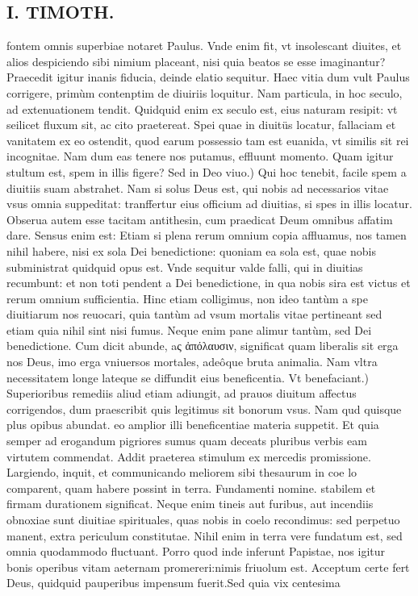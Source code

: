 \documentclass{article}
\begin{document}
\begin{pages}
\section*{I. TIMOTH. }
\marginpar{[ p.84 ]}\pstart fontem omnis superbiae notaret Paulus. Vnde enim fit, vt insolescant diuites, et alios despiciendo sibi nimium placeant, nisi quia beatos se esse imaginantur? Praecedit igitur inanis fiducia, deinde elatio sequitur. Haec vitia dum vult Paulus corrigere, primùm contenptim de diuiriis loquitur. Nam particula, in hoc seculo, ad extenuationem tendit. Quidquid enim ex seculo est, eius naturam resipit: vt seilicet fluxum sit, ac cito praetereat. Spei quae in diuitüs locatur, fallaciam et vanitatem ex eo ostendit, quod earum possessio tam est euanida, vt similis sit rei incognitae. Nam dum eas tenere nos putamus, effluunt momento. Quam igitur stultum est, spem in illis figere?  \pend\pstart Sed in Deo viuo.) Qui hoc tenebit, facile spem a diuitiis suam abstrahet. Nam si solus Deus est, qui nobis ad necessarios vitae vsus omnia suppeditat: tranffertur eius officium ad diuitias, si spes in illis locatur. Obserua autem esse tacitam antithesin, cum praedicat Deum omnibus affatim dare. Sensus enim est: Etiam si plena rerum omnium copia affluamus, nos tamen nihil habere, nisi ex sola Dei benedictione: quoniam ea sola est, quae nobis subministrat quidquid opus est. Vnde sequitur valde falli, qui in diuitias recumbunt: et non toti pendent a Dei benedictione, in qua nobis sira est victus et rerum omnium sufficientia. Hinc etiam colligimus, non ideo tantùm a spe diuitiarum nos reuocari, quia tantùm ad vsum mortalis vitae pertineant sed etiam quia nihil sint nisi fumus. Neque enim pane alimur tantùm, sed Dei benedictione. Cum dicit abunde, aς ἀπόλαυσιν, significat quam liberalis sit erga nos Deus, imo erga vniuersos mortales, adeôque bruta animalia. Nam vltra necessitatem longe lateque se diffundit eius beneficentia.  \pend\pstart Vt benefaciant.) Superioribus remediis aliud etiam adiungit, ad prauos diuitum affectus corrigendos, dum praescribit quis legitimus sit bonorum vsus. Nam qud quisque plus opibus abundat. eo amplior illi beneficentiae materia suppetit. Et quia semper ad erogandum pigriores sumus quam deceats pluribus verbis eam virtutem commendat. Addit praeterea stimulum ex mercedis promissione. Largiendo, inquit, et communicando meliorem sibi thesaurum in coe lo comparent, quam habere possint in terra. Fundamenti nomine. stabilem et firmam durationem significat. Neque enim tineis aut furibus, aut incendiis obnoxiae sunt diuitiae spirituales, quas nobis in coelo recondimus: sed perpetuo manent, extra periculum constitutae. Nihil enim in terra vere fundatum est, sed omnia quodammodo fluctuant. Porro quod inde inferunt Papistae, nos igitur bonis operibus vitam aeternam promereri:nimis friuolum est. Acceptum certe fert Deus, quidquid pauperibus impensum fuerit.Sed quia vix centesima  \pend

\end{pages}
\end{document}
